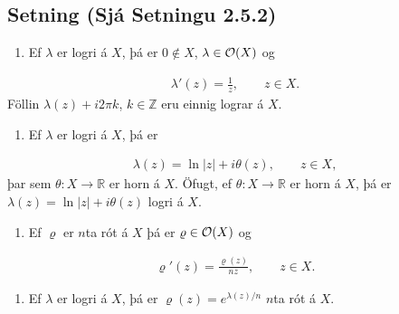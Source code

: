 \documentclass[a4paper,10pt,icelandic]{sphinxmanual}
\begin{document}
\subsection{Setning (Sjá Setningu 2.5.2)}
\label{\detokenize{Kafli02:setning-sja-setningu-2-5-2}}\begin{enumerate}
%
\item {} 
Ef \(\lambda\) er logri á \(X\), þá er \(0\not\in X\), \(\lambda\in {\cal O}(X)\) og

\end{enumerate}
\begin{equation*}
\begin{split}\lambda'(z)=\frac 1z, \qquad z\in X.\end{split}
\end{equation*}
Föllin \(\lambda(z)+i2\pi k\), \(k\in \mathbb{Z}\) eru einnig lograr á \(X\).
\begin{enumerate}
%
\setcounter{enumi}{1}
\item {} 
Ef \(\lambda\) er logri á \(X\), þá er

\end{enumerate}
\begin{equation*}
\begin{split}\lambda(z)=\ln
|z|+i\theta(z), \qquad z\in X,\end{split}
\end{equation*}
þar sem \(\theta:X\to \mathbb{R}\) er horn á \(X\). Öfugt, ef \(\theta:X\to \mathbb{R}\) er horn á \(X\), þá er \(\lambda(z)=\ln|z|+i\theta(z)\) logri á \(X\).
\begin{enumerate}
%
\setcounter{enumi}{2}
\item {} 
Ef \(\varrho\) er \(n\)\textendash{}ta rót á \(X\) þá er \(\varrho\in {\cal O}(X)\) og

\end{enumerate}
\begin{equation*}
\begin{split}\varrho'(z)=\frac {\varrho(z)}{nz}, \qquad z\in X.\end{split}
\end{equation*}\begin{enumerate}
%
\setcounter{enumi}{3}
\item {} 
Ef \(\lambda\) er logri á \(X\), þá er \(\varrho(z)=e^{\lambda(z)/n}\) \(n\)\textendash{}ta rót á \(X\).

\end{enumerate}
\end{document}
